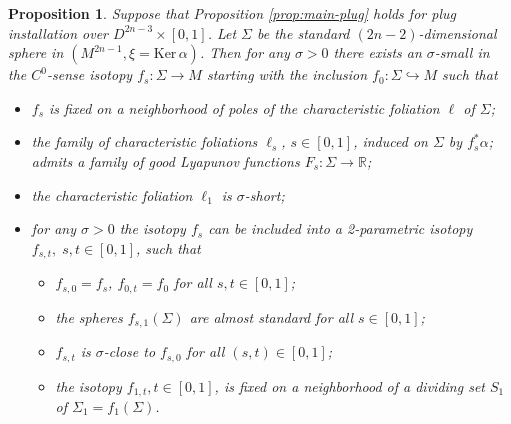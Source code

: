 \documentclass[12pt]{amsart}
\theoremstyle{plain}
\newtheorem{prop}[theorem]{Proposition}
\theoremstyle{definition}
\theoremstyle{remark}
\newcommand{\R}{\mathbb{R}}
\newcommand{\Ker}{\mathrm{Ker\,}}
\begin{document}
 \begin{prop}\label{prop:plugs-in-convex} Suppose that Proposition \ref{prop:main-plug}  holds for plug installation over $D^{2n-3}\times[0,1]$.
 Let $\Sigma$ be the standard $(2n-2)$-dimensional sphere in  $(M^{2n-1},\xi=\Ker\alpha)$. Then  for any $\sigma>0$ there exists  an $\sigma$-small in the $C^0$-sense isotopy $f_{s}:\Sigma\to M$ starting  with  the inclusion $f_0:\Sigma\hookrightarrow M$ such that
  \begin{itemize} 
 \item[a)] $f_{s}$ is fixed on a neighborhood of poles of the characteristic foliation $\ell$  of $\Sigma$;
 \item[b)] the family of characteristic foliations $\ell_{s}$, $s\in[0,1]$, induced on $\Sigma$ by $f_s^*\alpha$;
  admits a family of good Lyapunov functions $F_s:\Sigma\to\R$;
  \item[c)] the characteristic foliation $\ell_{1}$  
 is $\sigma$-short;
 \item[d)] for any $\sigma>0$ the isotopy $f_{s}$ can be included into a 2-parametric isotopy $f_{s,t}, \;s,t\in[0,1]$, such that
 \begin{itemize}
 \item[(i)] $f_{s,0}=f_s$, $f_{0,t}=f_0$ for all $s,t\in[0,1]$;
 \item[(ii)] the  spheres $f_{s,1}(\Sigma)$ are almost standard for all $s\in[0,1]$;
 \item[(iii)] $f_{s,t}$ is         $\sigma$-close to $f_{s,0}$ for all $(s,t)\in[0,1]$;
 \item[(iv)]  the isotopy $f_{1,t}, t\in[0,1]$, is fixed on a neighborhood of a dividing set $S_1$ of  $\Sigma_1=f_1(\Sigma)$.
 \end{itemize}
 \end{itemize}
  \end{prop}
 
\end{document}
